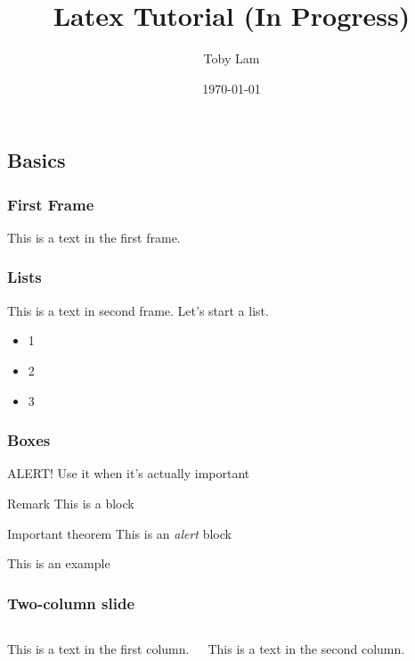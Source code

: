 \documentclass{beamer}
\title{Latex Tutorial (In Progress)}
\author{Toby Lam}
\date{\today}
\begin{document}
 
\frame{\titlepage}

\begin{frame}
\tableofcontents
\end{frame}
 
 
 
\begin{frame}
\section{Basics}
\frametitle{First Frame}
This is a text in the first frame.
\end{frame}
 
 
 
 
 
 \begin{frame}
 \frametitle{Lists}
 This is a text in second frame. Let's start a list.
 
 \begin{itemize}
 	\item 1 \pause
 	\item 2 \pause
 	\item 3 \pause
 \end{itemize}
 
\end{frame}


\begin{frame}
\frametitle{Boxes}

\alert{ALERT!} Use it when it's actually important

\begin{block}{Remark}
	This is a block
\end{block}

\begin{alertblock}{Important theorem}
	This is an \textit{alert} block
\end{alertblock}

\begin{examples}
	This is an example
\end{examples}

\end{frame}

\begin{frame}
\frametitle{Two-column slide}
\begin{columns}
	
	This is a text in the first column.
	
	This is a text in the second column.
	
\end{columns}
\end{frame}








 
\end{document}
